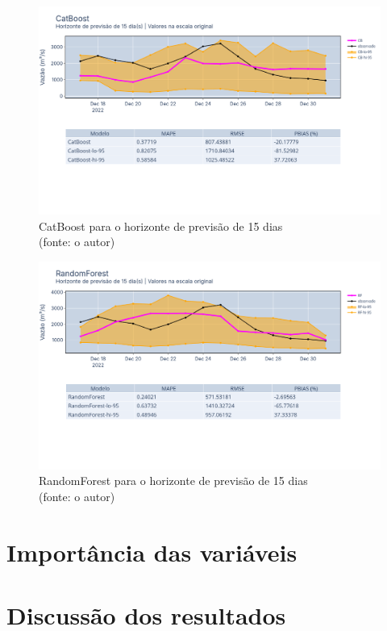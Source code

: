 \begin{figure}[!h]
	\centering
	\includegraphics[scale=0.33]{Figuras/jequiti/resultados/CatBoost_fh15.png}
	\caption{CatBoost para o horizonte de previsão de 15 dias\\(fonte: o autor)}
	\label{fig:jequiti_CatBoostRegressor_fh15}
\end{figure}

\begin{figure}[!h]
	\centering
	\includegraphics[scale=0.33]{Figuras/jequiti/resultados/RandomForest_fh15.png}
	\caption{RandomForest para o horizonte de previsão de 15 dias\\(fonte: o autor)}
	\label{fig:jequiti_RandomForest_fh15}
\end{figure}
\clearpage

\section{Importância das variáveis}

\section{Discuss\~ao dos resultados}
